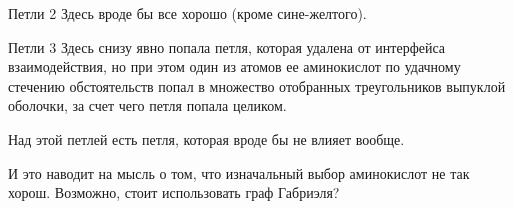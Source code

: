 \documentclass[10pt, xcolor={dvipsnames}]{beamer}
\begin{document}
\begin{frame}{Петли 2}
Здесь вроде бы все хорошо (кроме сине-желтого).
\begin{center}
\end{center}

\end{frame}

\begin{frame}{Петли 3}
Здесь снизу явно попала петля, которая удалена от интерфейса взаимодействия, но при этом один из атомов ее аминокислот по удачному стечению обстоятельств попал в множество отобранных треугольников выпуклой оболочки, за счет чего петля попала целиком.

Над этой петлей есть петля, которая вроде бы не влияет вообще. 

И это наводит на мысль о том, что изначальный выбор аминокислот не так хорош. Возможно, стоит использовать граф Габриэля? 
\begin{center}
\end{center}

\end{frame}
\end{document}
